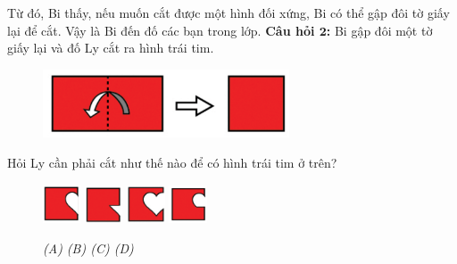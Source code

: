 Từ đó, Bi thấy, nếu muốn cắt được một hình đối xứng, Bi có thể gập đôi tờ giấy lại để cắt. Vậy là Bi đến đố các bạn trong lớp.
\vskip 0.1cm
\textbf{\color{toancuabi}Câu hỏi $\pmb{2}$:} Bi gập đôi một tờ giấy lại và đố Ly cắt ra hình trái tim.
\begin{figure}[H]
	\centering
	\captionsetup{labelformat=empty}
	\vspace*{-5pt}
	\captionsetup{justification=centering}
	\includegraphics[width =0.65\textwidth]{cat-4}
	\vspace*{-10pt}
\end{figure}
Hỏi Ly cần phải cắt như thế nào để có hình trái tim ở trên?
\begin{figure}[H]
	\centering
	\captionsetup{labelformat=empty}
	\vspace*{-4pt}
	\captionsetup{justification=centering}
	\includegraphics[width =0.1\textwidth]{cat-4a}
	\hfill
	\includegraphics[width =0.1\textwidth]{cat-4b}
	\hfill
	\includegraphics[width =0.1\textwidth]{cat-4c}
	\hfill
	\includegraphics[width =0.1\textwidth]{cat-4d}
	\vspace*{-5pt}
	\caption{\small \it (A)\hspace*{75pt} (B)\hspace*{75pt} (C) \hspace*{75pt} (D)}
	\vspace*{-10pt}
\end{figure}
